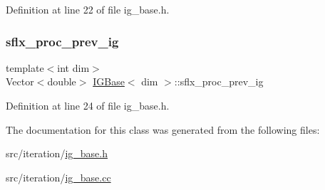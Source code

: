 Definition at line 22 of file ig\+\_\+base.\+h.

\mbox{\label{class_i_g_base_a0a301d6077cb7c94ab0942ab3d5082a5}} 
\subsubsection{\texorpdfstring{sflx\+\_\+proc\+\_\+prev\+\_\+ig}{sflx\_proc\_prev\_ig}}
{\footnotesize\ttfamily template$<$int dim$>$ \\
Vector$<$double$>$ \hyperlink{class_i_g_base}{I\+G\+Base}$<$ dim $>$\+::sflx\+\_\+proc\+\_\+prev\+\_\+ig\hspace{0.3cm}{\ttfamily [protected]}}



Definition at line 24 of file ig\+\_\+base.\+h.



The documentation for this class was generated from the following files\+:\begin{DoxyCompactItemize}
\item 
src/iteration/\hyperlink{ig__base_8h}{ig\+\_\+base.\+h}\item 
src/iteration/\hyperlink{ig__base_8cc}{ig\+\_\+base.\+cc}\end{DoxyCompactItemize}
